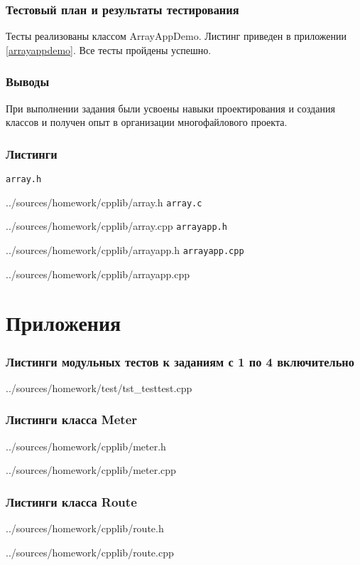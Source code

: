 \documentclass[12pt,a4paper]{report}
\begin{document}
\subsection{Тестовый план и результаты тестирования}
Тесты реализованы классом ArrayAppDemo. Листинг приведен в приложении \ref{arrayappdemo}. Все тесты пройдены успешно.
\subsection{Выводы}
\hspace{\parindent}При выполнении задания были усвоены навыки проектирования и создания классов и получен опыт в организации многофайлового проекта.

\newpage
\subsection{Листинги}
\verb+array.h+

{../sources/homework/cpplib/array.h}
\verb+array.c+

{../sources/homework/cpplib/array.cpp}
\verb+arrayapp.h+

{../sources/homework/cpplib/arrayapp.h}
\verb+arrayapp.cpp+

{../sources/homework/cpplib/arrayapp.cpp}




\chapter*{Приложения}
\subsection*{Листинги модульных тестов к заданиям с 1 по 4 включительно}

{../sources/homework/test/tst_testtest.cpp}
\newpage

\subsection*{Листинги класса Meter}

{../sources/homework/cpplib/meter.h}

{../sources/homework/cpplib/meter.cpp}
\newpage

\subsection*{Листинги класса Route}

{../sources/homework/cpplib/route.h}

{../sources/homework/cpplib/route.cpp}
\newpage
\end{document}
